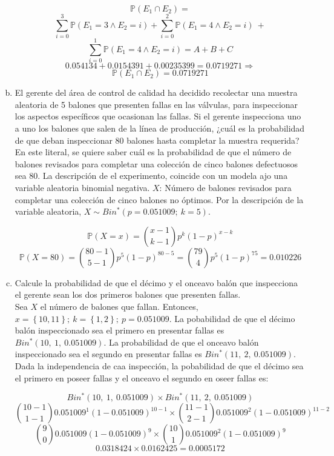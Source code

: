 \documentclass[11pt, spanish]{article}
\begin{document}
\begin{enumerate}[(a)]
$$\mathbb{P}(E_1 \cap E_2) = $$
$$ \sum_{i = 0}^{3} \mathbb{P}(E_1 = 3 \wedge E_2 = i) +  \sum_{i = 0}^{2} \mathbb{P}(E_1 = 4 \wedge E_2 = i)\ + $$
$$ \sum_{i = 0}^{1} \mathbb{P}(E_1 = 4 \wedge E_2 = i) = A + B + C$$
$$0.054134 + 0.0154391 + 0.00235399 = 0.0719271 \Rightarrow$$
$$\mathbb{P}(E_1 \cap E_2) = 0.0719271$$

\item El gerente del área de control de calidad ha decidido recolectar una muestra
aleatoria de 5 balones que presenten fallas en las válvulas, para inspeccionar los aspectos
específicos que ocasionan las fallas. Si el gerente inspecciona uno a uno los balones que
salen de la línea de producción, ¿cuál es la probabilidad de que deban inspeccionar 80
balones hasta completar la muestra requerida?\\

En este literal, se quiere saber cuál es la probabilidad de que el número de balones revisados para completar una colección de cinco balones defectuosos sea 80. La descripción de el experimento, coincide con un modela ajo una variable aleatoria binomial negativa. $X$: Número de balones revisados para completar una colección de cinco balones no óptimos. Por la descripción de la variable aleatoria, $X \sim Bin^{*}(p = 0.051009;\ k = 5)$. 

$$\mathbb{P}(X = x) = \binom{x - 1}{k - 1}p^k(1 - p)^{x - k}$$
$$\mathbb{P}(X = 80) = \binom{80 - 1}{5 - 1}p^5(1 - p)^{80 - 5} = \binom{79}{4}p^5(1 - p)^{75} = 0.010226$$

\item Calcule la probabilidad de que el décimo y el onceavo balón que inspecciona el
gerente sean los dos primeros balones que presenten fallas.\\

Sea $X$ el número de balones que fallan. Entonces, $x = \left\{ 10, 11\right\};\ k = \left\{ 1, 2\right\};\ p = 0.051009$. La pobabilidad de que el décimo balón inspeccionado sea el primero en presentar fallas es $Bin^*(10,\ 1,\ 0.051009)$. La probabilidad de que el onceavo balón inspeccionado sea el segundo en presentar fallas es $Bin^*(11,\ 2,\ 0.051009)$. Dada la independencia de caa inspección, la pobabilidad de que el décimo sea el primero en poseer fallas y el onceavo el segundo en oseer fallas es: 

$$Bin^*(10,\ 1,\ 0.051009) \times Bin^*(11,\ 2,\ 0.051009)$$
$$\binom{10 - 1}{1 - 1}0.051009^1(1 - 0.051009)^{10 - 1} \times \binom{11 - 1}{2 - 1}0.051009^2(1 - 0.051009)^{11 - 2}$$
$$\binom{9}{0}0.051009(1 - 0.051009)^{9} \times \binom{10}{1}0.051009^2(1 - 0.051009)^{9}$$
$$0.0318424 \times 0.0162425 = 0.0005172$$


\end{enumerate}
\end{document}
